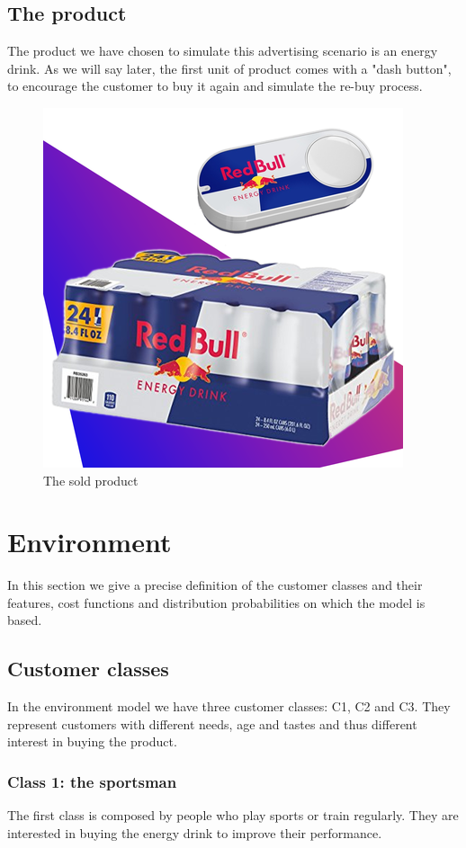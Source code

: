 \documentclass[12pt,a4paper]{report}
\begin{document}
\section{The product}
The product we have chosen to simulate this advertising scenario is an energy drink. As we will say later, the first unit of product comes with a "dash button", to encourage the customer to buy it again and simulate the re-buy process.
\begin{figure}[H]
\centering
  \includegraphics[scale = 0.7, center]{redbull-dash}
  \caption{The sold product}
\end{figure}

	\chapter{Environment}		
In this section we give a precise definition of the customer classes and their features, cost functions and distribution probabilities on which the model is based.
		\section{Customer classes}
In the environment model we have three customer classes: C1, C2 and C3.
They represent customers with different needs, age and tastes and thus different interest in buying the product.
			\subsection{Class 1: the sportsman}
The first class is composed by people who play sports or train regularly. They are interested in buying the energy drink to improve their performance. 
\end{document}
